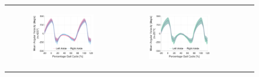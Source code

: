 \begin{figure}[p]
\begin{tabular}{lccc}
        \begin{subfigure}[b]{0.275\textwidth}\includegraphics[width=\linewidth]{content/5-Personalisation/Gyro_Trends_For_Targets/ch5_gait_trends_subject_01_activity_walking.pdf}\end{subfigure} & \begin{subfigure}[b]{0.275\textwidth}\includegraphics[width=\linewidth]{content/5-Personalisation/Gyro_Trends_For_Targets/ch5_gait_trends_subject_03_activity_walking.pdf}\end{subfigure} &

\end{tabular}
\end{figure}
